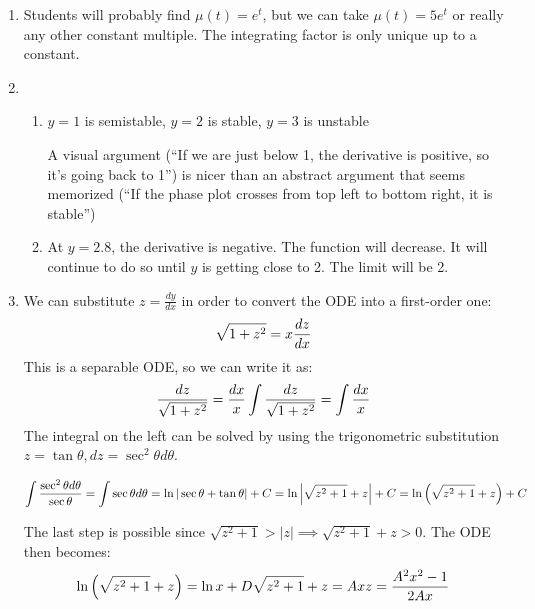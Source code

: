\begin{enumerate}
\item 
Students will probably find $\mu(t)=e^t$, but we can take $\mu(t)=5e^t$ or really any other constant multiple. The integrating factor is only unique up to a constant.

\item 
\begin{enumerate}
    \item 
    $y=1$ is semistable,
    $y=2$ is stable,
    $y=3$ is unstable
    
    A visual argument (``If we are just below 1, the derivative is positive, so it's going back to 1'') is nicer than an abstract argument that seems memorized (``If the phase plot crosses from top left to bottom right, it is stable'')

    \item 
    At $y=2.8$, the derivative is negative. The function will decrease. It will continue to do so until $y$ is getting close to 2. The limit will be 2.
\end{enumerate}

    \item 
    We can substitute $z = \frac{dy}{dx}$ in order to convert the ODE into a first-order one:
	        \[
	            \sqrt{1 + z^2} = x\frac{dz}{dx}\\
	        \]
	        This is a separable ODE, so we can write it as:
	        \[
	            \frac{dz}{\sqrt{1+z^2}} = \frac{dx}{x}\\
	            \int\frac{dz}{\sqrt{1+z^2}} = \int\frac{dx}{x}\\
	        \]
	        The integral on the left can be solved by using the trigonometric substitution $z = \tan{\theta}, dz = \sec^2{\theta}d\theta$.
	        
	        \[
	            \int\frac{\sec^2{\theta}d\theta}{\sec{\theta}}\\
	            = \int\sec{\theta}d\theta\\
	            = \ln|\sec{\theta} + \tan{\theta}| + C\\
	            = \ln{\left|\sqrt{z^2+1} + z\right|} + C\\
	            = \ln{\left(\sqrt{z^2+1} + z\right)} + C
	        \]
	        
	        The last step is possible since $\sqrt{z^2+1} > |z| \implies \sqrt{z^2 + 1} + z > 0$.
	        The ODE then becomes:
	        \[
	            \ln{\left(\sqrt{z^2+1} + z\right)} = \ln x + D\\
	            \sqrt{z^2+1} + z = Ax\\
	            z = \frac{A^2x^2-1}{2Ax}
	        \]
	        

\end{enumerate}
